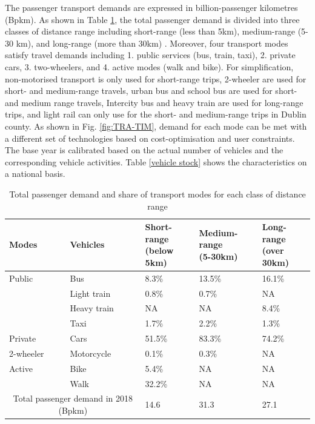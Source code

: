 \documentclass[gmd,manuscript]{copernicus}
\begin{document}
The passenger transport demands are expressed in billion-passenger kilometres (Bpkm). As shown in Table \ref{passenger transport demand}, the total passenger demand is divided into three classes of distance range including short-range (less than 5km), medium-range (5-30 km), and long-range (more than 30km) \citep{NTA2018}. Moreover, four transport modes satisfy travel demands including 1. public services (bus, train, taxi), 2. private cars, 3. two-wheelers, and 4. active modes (walk and bike). For simplification, non-motorised transport is only used for short-range trips, 2-wheeler are used for short- and medium-range travels, urban bus and school bus are used for short- and medium range travels, Intercity bus and heavy train are used for long-range trips, and light rail can only use for the short- and medium-range trips in Dublin county. As shown in Fig. \ref{fig:TRA-TIM}, demand for each mode can be met with a different set of technologies based on cost-optimisation and user constraints. The base year is calibrated based on the actual number of vehicles and the corresponding vehicle activities. Table \ref{vehicle stock} shows the characteristics on a national basis. 

\begin{table}[h!]
 \centering
 \footnotesize
 \caption{Total passenger demand and share of transport modes for each class of distance range \citep{CentralStatisticsOffice2017, CSONTS19how, CentralStatisticsOffice2020a, CentralStatisticsOffice2020c, CentralStatisticsOffice2020d, CentralStatisticsOffice2020e}}
 \begin{tabular}{lllll}
 \hline 
 Modes & Vehicles & \makecell{Short-range \\ (below 5km)} & \makecell{Medium-range \\ (5-30km)} & \makecell{Long-range \\ (over 30km)} \\ 
 \hline
 Public & Bus & 8.3\% &	13.5\% &	16.1\% \\
 & Light train &	0.8\% &	0.7\% &	NA \\
 & Heavy train &	NA & NA &	8.4\% \\
 & Taxi &	1.7\% &	2.2\% &	1.3\% \\
 \hline
 Private & Cars	& 51.5\% &	83.3\%	& 74.2\% \\
 \hline
 2-wheeler & Motorcycle & 0.1\% &	0.3\%	& NA \\
 \hline
 Active & Bike &	5.4\% & 	NA & 	NA \\
 
 & Walk &	32.2\% &	NA &	NA \\
 \hline
 \multicolumn{2}{c}{Total passenger demand in 2018 (Bpkm)} &	14.6 &	31.3 &	27.1 \\ [1ex]
 \hline
 \end{tabular}
 
 \label{passenger transport demand}
\end{table}
\end{document}
